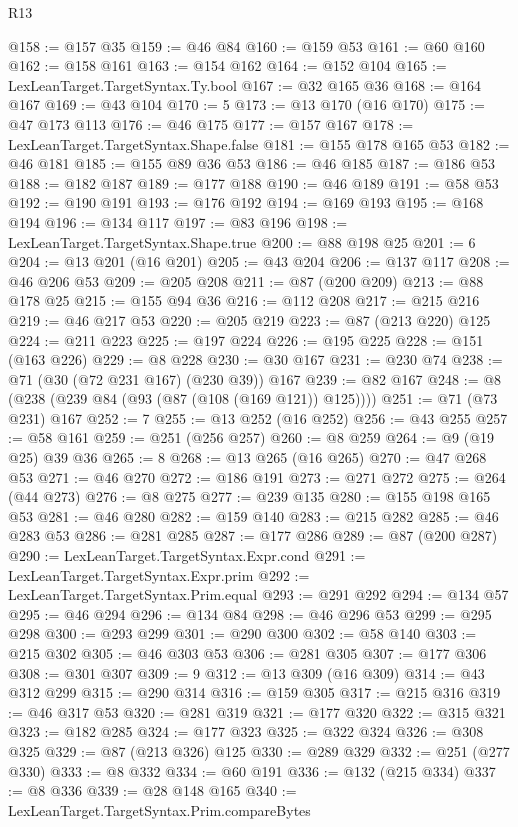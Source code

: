 \begin{lexlean}{R13}
\begin{coremodule}
@158 := @157 @35
@159 := @46 @84
@160 := @159 @53
@161 := @60 @160
@162 := @158 @161
@163 := @154 @162
@164 := @152 @104
@165 := LexLeanTarget.TargetSyntax.Ty.bool
@167 := @32 @165 @36
@168 := @164 @167
@169 := @43 @104
@170 := 5
@173 := @13 @170 (@16 @170)
@175 := @47 @173 @113
@176 := @46 @175
@177 := @157 @167
@178 := LexLeanTarget.TargetSyntax.Shape.false
@181 := @155 @178 @165 @53
@182 := @46 @181
@185 := @155 @89 @36 @53
@186 := @46 @185
@187 := @186 @53
@188 := @182 @187
@189 := @177 @188
@190 := @46 @189
@191 := @58 @53
@192 := @190 @191
@193 := @176 @192
@194 := @169 @193
@195 := @168 @194
@196 := @134 @117
@197 := @83 @196
@198 := LexLeanTarget.TargetSyntax.Shape.true
@200 := @88 @198 @25
@201 := 6
@204 := @13 @201 (@16 @201)
@205 := @43 @204
@206 := @137 @117
@208 := @46 @206 @53
@209 := @205 @208
@211 := @87 (@200 @209)
@213 := @88 @178 @25
@215 := @155 @94 @36
@216 := @112 @208
@217 := @215 @216
@219 := @46 @217 @53
@220 := @205 @219
@223 := @87 (@213 @220) @125
@224 := @211 @223
@225 := @197 @224
@226 := @195 @225
@228 := @151 (@163 @226)
@229 := @8 @228
@230 := @30 @167
@231 := @230 @74
@238 := @71 (@30 (@72 @231 @167) (@230 @39)) @167
@239 := @82 @167
@248 := @8 (@238 (@239 @84 (@93 (@87 (@108 (@169 @121)) @125))))
@251 := @71 (@73 @231) @167
@252 := 7
@255 := @13 @252 (@16 @252)
@256 := @43 @255
@257 := @58 @161
@259 := @251 (@256 @257)
@260 := @8 @259
@264 := @9 (@19 @25) @39 @36
@265 := 8
@268 := @13 @265 (@16 @265)
@270 := @47 @268 @53
@271 := @46 @270
@272 := @186 @191
@273 := @271 @272
@275 := @264 (@44 @273)
@276 := @8 @275
@277 := @239 @135
@280 := @155 @198 @165 @53
@281 := @46 @280
@282 := @159 @140
@283 := @215 @282
@285 := @46 @283 @53
@286 := @281 @285
@287 := @177 @286
@289 := @87 (@200 @287)
@290 := LexLeanTarget.TargetSyntax.Expr.cond
@291 := LexLeanTarget.TargetSyntax.Expr.prim
@292 := LexLeanTarget.TargetSyntax.Prim.equal
@293 := @291 @292
@294 := @134 @57
@295 := @46 @294
@296 := @134 @84
@298 := @46 @296 @53
@299 := @295 @298
@300 := @293 @299
@301 := @290 @300
@302 := @58 @140
@303 := @215 @302
@305 := @46 @303 @53
@306 := @281 @305
@307 := @177 @306
@308 := @301 @307
@309 := 9
@312 := @13 @309 (@16 @309)
@314 := @43 @312 @299
@315 := @290 @314
@316 := @159 @305
@317 := @215 @316
@319 := @46 @317 @53
@320 := @281 @319
@321 := @177 @320
@322 := @315 @321
@323 := @182 @285
@324 := @177 @323
@325 := @322 @324
@326 := @308 @325
@329 := @87 (@213 @326) @125
@330 := @289 @329
@332 := @251 (@277 @330)
@333 := @8 @332
@334 := @60 @191
@336 := @132 (@215 @334)
@337 := @8 @336
@339 := @28 @148 @165
@340 := LexLeanTarget.TargetSyntax.Prim.compareBytes

\end{coremodule}
\end{lexlean}
